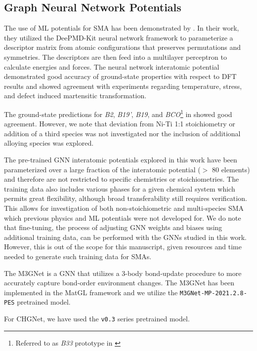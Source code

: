 \documentclass[preprint,colorlinks=true,linkcolor=black,citecolor=black]{elsarticle}
\begin{document}
\subsection{Graph Neural Network Potentials}

The use of ML potentials for SMA has been demonstrated by
\citet{Tang2022}. In their work, they utilized the
DeePMD-Kit\cite{Wang2018} neural network framework to parameterize a
descriptor matrix from atomic configurations that preserves
permutations and symmetries. The descriptors are then feed into a
multilayer perceptron to calculate energies and forces. The neural
network interatomic potential demonstrated good accuracy of
ground-state properties with respect to DFT results and showed
agreement with experiments regarding temperature, stress, and defect
induced martensitic transformation. \paragraphmark

The ground-state predictions for \textit{B2}, \textit{B19'},
\textit{B19}, and \textit{BCO}\footnote{Referred to as \textit{B33}
	prototype in \citet{Tang2022}} in \citet{Tang2022} showed good
agreement. However, we note that deviation from Ni-Ti 1:1
stoichiometry or addition of a third species was not investigated nor
the inclusion of additional alloying species was explored. \par

The pre-trained GNN interatomic potentials explored in this work have
been parameterized over a large fraction of the interatomic potential
($>$ 80 elements) and therefore are not restricted to specific
chemistries or stoichiometries. The training data also includes
various phases for a given chemical system which permits great
flexibility, although broad transferability still requires
verification.  This allows for investigation of both
non-stoichiometric and multi-species SMA which previous physics and ML
potentials were not developed for. We do note that fine-tuning, the
process of adjusting GNN weights and biases using additional training
data, can be performed with the GNNs studied in this work. However,
this is out of the scope for this manuscript, given resources and time
needed to generate such training data for SMAs. \par

The M3GNet is a GNN that utilizes a 3-body bond-update procedure to
more accurately capture bond-order environment changes. The M3GNet has
been implemented in the MatGL framework and we utilize the
\texttt{M3GNet-MP-2021.2.8-PES} pretrained model.

For CHGNet, we have used the \texttt{v0.3} series pretrained model.
\end{document}
